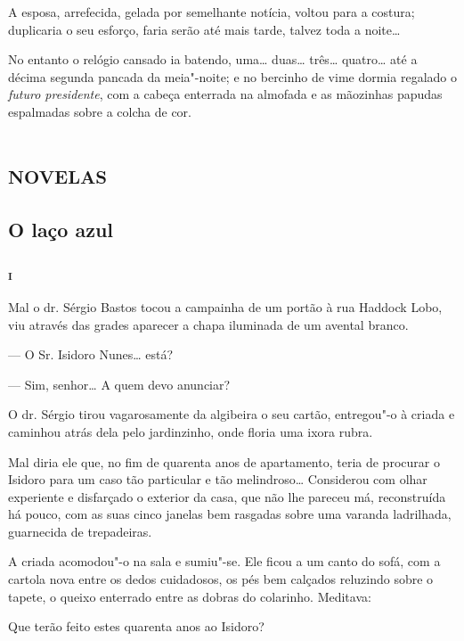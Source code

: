 A esposa, arrefecida, gelada por semelhante notícia, voltou para a
costura; duplicaria o seu esforço, faria serão até mais tarde, talvez
toda a noite\ldots{}

No entanto o relógio cansado ia batendo, uma\ldots{} duas\ldots{} três\ldots{}
quatro\ldots{} até a décima segunda pancada da meia"-noite; e no bercinho de
vime dormia regalado o \emph{futuro presidente}, com a cabeça enterrada
na almofada e as mãozinhas papudas espalmadas sobre a colcha de cor.


\part{\textsc{novelas}}

\chapter[O laço azul]{O laço azul}



\section*{\textsc{i}}

Mal o dr. Sérgio Bastos tocou a campainha de um portão à rua Haddock
Lobo, viu através das grades aparecer a chapa iluminada de um avental
branco.

--- O Sr. Isidoro Nunes\ldots{} está?

--- Sim, senhor\ldots{} A quem devo anunciar?

O dr. Sérgio tirou vagarosamente da algibeira o seu cartão, entregou"-o à
criada e caminhou atrás dela pelo jardinzinho, onde floria uma ixora
rubra.

Mal diria ele que, no fim de quarenta anos de apartamento, teria de
procurar o Isidoro para um caso tão particular e tão melindroso\ldots{}
Considerou com olhar experiente e disfarçado o exterior da casa, que não
lhe pareceu má, reconstruída há pouco, com as suas cinco janelas bem
rasgadas sobre uma varanda ladrilhada, guarnecida de trepadeiras.

A criada acomodou"-o na sala e sumiu"-se. Ele ficou a um canto do sofá,
com a cartola nova entre os dedos cuidadosos, os pés bem calçados
reluzindo sobre o tapete, o queixo enterrado entre as dobras do
colarinho. Meditava:

Que terão feito estes quarenta anos ao Isidoro?

